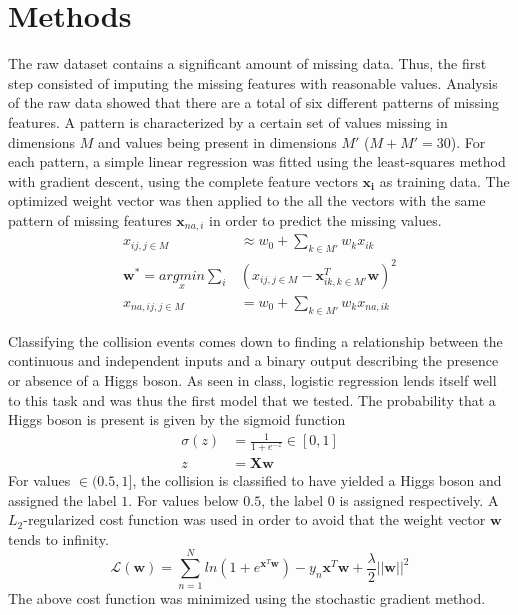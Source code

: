 \documentclass[10pt,conference,compsocconf]{IEEEtran}
\begin{document}
\section*{Methods}
The raw dataset contains a significant amount of missing data. Thus, the first step consisted of imputing the missing features with reasonable values. Analysis of the raw data showed that there are a total of six different patterns of missing features. A pattern is characterized by a certain set of values missing in dimensions $M$ and values being present in dimensions $M'$ ($M+M' = 30$). For each pattern, a simple linear regression was fitted using the least-squares method with gradient descent, using the complete feature vectors $\boldsymbol{x_i}$ as training data. The optimized weight vector was then applied to the all the vectors with the same pattern of missing features $\boldsymbol{x}_{na,i}$ in order to predict the missing values.
\begin{align*}
{x}_{ij, j \in M} &\approx w_0 + \sum_{k \in M'} w_k {x}_{ik}\\
\boldsymbol{w}^* = \underset{x}{argmin}\sum_i & ({x}_{ij, j \in M} - \boldsymbol{x}^T_{ik, k \in M'} \boldsymbol{w})^2\\
{x}_{na,ij, j \in M} &= w_0 + \sum_{k \in M'} w_k {x}_{na,ik}
\end{align*} \par
Classifying the collision events comes down to finding a relationship between the continuous and independent inputs and a binary output describing the presence or absence of a Higgs boson. As seen in class, logistic regression lends itself well to this task and was thus the first model that we tested. 
The probability that a Higgs boson is present is given by the sigmoid function
\begin{align*}
\sigma(z) &= \frac{1}{1+e^{-z}} \in [0,1]\\
z & = \boldsymbol{Xw} 
\end{align*}
For values $\in (0.5,1]$, the collision is classified to have yielded a Higgs boson and assigned the label $1$. For values below $0.5$, the label $0$ is assigned respectively. A $L_2$-regularized cost function was used in order to avoid that the weight vector $\boldsymbol{w}$ tends to infinity.  
\begin{equation}
\mathcal{L}(\boldsymbol{w}) = \sum_{n=1}^N ln(1+e^{\boldsymbol{x}^T\boldsymbol{w}}) - y_n \boldsymbol{x}^T\boldsymbol{w} + \frac{\lambda}{2}||\boldsymbol{w}||^2
\end{equation}
The above cost function was minimized using the stochastic gradient method. \par
\end{document}
